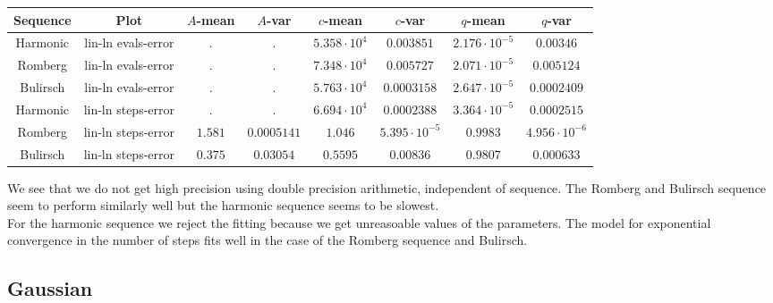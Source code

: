 \begin{table}[H]
    \centering
    \small
    \begin{tabular}{c|c||c|c|c|c|c	|c}
Sequence & Plot & \(A\)-mean & \(A\)-var & \(c\)-mean & \(c\)-var & \(q\)-mean & \(q\)-var\\\hline
\rowcolor{red}
Harmonic & lin-ln evals-error & \(.\) & \(.\) & \(5.358\cdot 10^4\) & \(0.003851\) & \(2.176\cdot 10^{-5}\) & \(0.00346\) \\
\rowcolor{red}
Romberg & lin-ln evals-error & \(.\) & \(.\) & \(7.348\cdot 10^4\) & \(0.005727\) & \(2.071\cdot 10^{-5}\) & \(0.005124\) \\
\rowcolor{red}
Bulirsch & lin-ln evals-error & \(.\) & \(.\) & \(5.763\cdot 10^4\) & \(0.0003158\) & \(2.647\cdot 10^{-5}\) & \(0.0002409\) \\
\rowcolor{red}
Harmonic & lin-ln steps-error & \(.\) & \(.\) & \(6.694\cdot 10^4\) & \(0.0002388\) & \(3.364\cdot 10^{-5}\) & \(0.0002515\) \\
\rowcolor{green}
Romberg & lin-ln steps-error & \(1.581\) & \(0.0005141\) & \(1.046\) & \(5.395\cdot 10^{-5}\) & \(0.9983\) & \(4.956\cdot 10^{-6}\) \\
\rowcolor{green}
Bulirsch & lin-ln steps-error & \(0.375\) & \(0.03054\) & \(0.5595\) & \(0.00836\) & \(0.9807\) & \(0.000633\) \\
    \end{tabular}
    \label{tab:my_label}
\end{table}

We see that we do not get high precision using double precision arithmetic, independent of sequence. The Romberg and Bulirsch sequence seem to perform similarly well but the harmonic sequence seems to be slowest.\\

For the harmonic sequence we reject the fitting because we get unreasoable values of the parameters. The model for exponential convergence in the number of steps fits well in the case of the Romberg sequence and Bulirsch.

\subsection{Gaussian}

